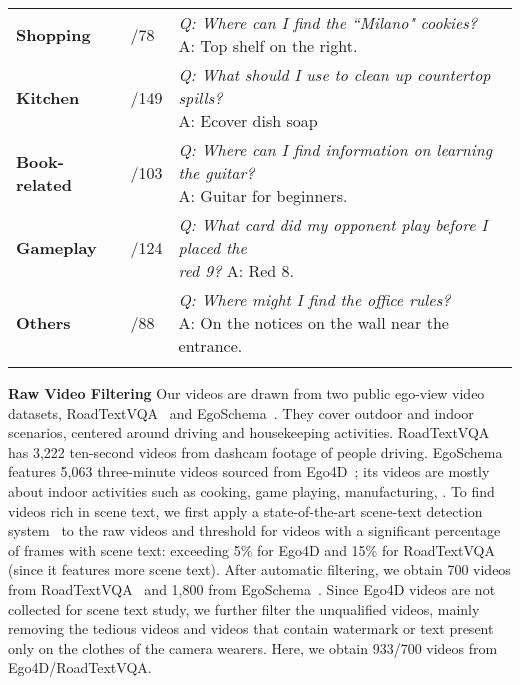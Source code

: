 \begin{table}
\begin{tabular}{>{\raggedright\arraybackslash}p{0.95cm} | >{\raggedright\arraybackslash}p{0.75cm} | >{\raggedright\arraybackslash}p{4.8cm}}
\cline{1-3}
\textbf{Shopping} & 358/78 &  \makecell[l]{\emph{Q: Where can I find the ``{\color{limegreen}Milano}" cookies?}  \\ A: Top shelf on the right. }   \\ 
\cline{1-3}
\textbf{Kitchen} & 335/149 & \makecell[l]{\emph{Q: What should I use to clean up countertop spills? } \\ A: {\color{limegreen}Ecover} dish soap }   \\ 
\cline{1-3}
\textbf{Book-related} & 323/103 & \makecell[l]{\emph{Q: Where can I find information on learning the guitar? } \\ A: {\color{limegreen}Guitar for beginners}. }  \\ 
\cline{1-3}
\textbf{Gameplay} & 301/124 & \makecell[l]{\emph{Q: What card did my opponent play before I placed the} \\ \emph{red {\color{limegreen}9}?}  A: Red {\color{limegreen}8}. }   \\ 
\cline{1-3}
\textbf{Others} & 201/88 & \makecell[l]{\emph{Q: Where might I find the office rules? } \\ A: On the notices on the wall near the entrance. } \\
\Xhline{1pt}
\end{tabular}
\vspace{-0.5cm}
\end{table}


\noindent\textbf{Raw Video Filtering} 
Our videos are drawn from two public ego-view video datasets, RoadTextVQA~\cite{tom2023reading} and EgoSchema~\cite{mangalam2023egoschema}. They cover outdoor and indoor scenarios, centered around driving and housekeeping activities. 
RoadTextVQA has 3,222 ten-second videos from dashcam footage of people driving. 
EgoSchema features 5,063 three-minute videos sourced from Ego4D~\cite{grauman2022ego4d}; its videos are mostly about indoor activities such as cooking, game playing, manufacturing, \etc.
To find videos rich in scene text, we first apply a state-of-the-art scene-text detection system~\cite{he2024gomatching} to the raw videos and threshold for videos with a significant percentage of frames with scene text: exceeding 5\% for Ego4D and 15\% for RoadTextVQA (since it features more scene text). 
After automatic filtering, we obtain 700 videos from RoadTextVQA~\cite{tom2023reading} and 1,800 from EgoSchema~\cite{grauman2022ego4d}. Since Ego4D videos are not collected for scene text study, we further filter the unqualified videos, mainly removing the tedious videos and videos that contain watermark or text present only on the clothes of the camera wearers. Here, we obtain 933/700 videos from Ego4D/RoadTextVQA.



